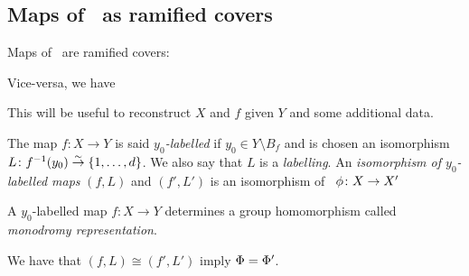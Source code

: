 \documentclass[10pt]{beamer}
\begin{document}

\subsection{Maps of \rss\ as ramified covers}

\begin{frame}

Maps of \rss\ are ramified covers:


Vice-versa, we have


This will be useful to reconstruct $X$ and $f$ given $Y$ and some additional data.

\end{frame}


\begin{frame}

\begin{definition}
	The map $f\colon X\to Y$ is said \emph{$y_0$-labelled} if $y_0\in Y\setminus B_f$ and is chosen an isomorphism $L\colon f^{-1}(y_0)\overset\sim\to \{1,\ldots,d\}$. We also say that $L$ is a \emph{labelling}. An \emph{isomorphism of $y_0$-labelled maps} $(f,L)$ and $(f',L')$ is an isomorphism of \rss\ $\phi\colon X\to X'$ \st 
\end{definition}

\begin{definition}
	A $y_0$-labelled map $f\colon X\to Y$ determines a group homomorphism 
	called \emph{monodromy representation}.
\end{definition}

We have that $(f,L)\cong(f',L')$ imply $\Phi=\Phi'$.

\end{frame}
\end{document}
